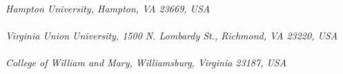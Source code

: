 \begin{titlepage}
\begin{center}
       \vspace*{1.0cm}
        \\
       \vspace*{0.2cm}
       \noindent \emph{Hampton University, Hampton, VA 23669, USA} \\

       \vspace*{1.0cm}
        \\
       \vspace*{0.2cm}
       \noindent \emph{Virginia Union University, 1500 N. Lombardy St., 
        Richmond, VA 23220, USA} \\
 
       \vspace*{1.0cm}
        \\
       \vspace*{0.2cm}
       \noindent \emph{College of William and Mary, Williamsburg, Virginia 23187, USA} \\
        
        
        
        \vspace*{0.7cm}
        \\
      \end{center}
\renewcommand*{\thefootnote}{\arabic{footnote}}

\date{\today}
     

\end{titlepage}
\sloppy

\titlepage
